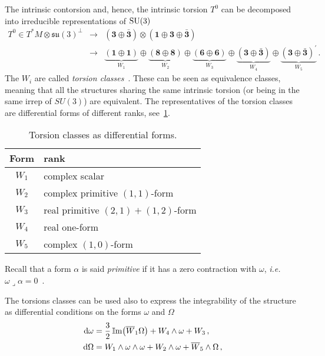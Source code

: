 \documentclass[debug]{phd}
\begin{document}
				The intrinsic contorsion and, hence, the intrinsic torsion $T^0$ can be decomposed into irreducible representations of $\mathrm{SU}(3)$					%
						\begin{equation*}
							\begin{array}{rrl}
								T^0 \in T^*M \otimes \mathfrak{su}(3)^{\perp}	& \rightarrow &	\left(\mathbf{3} \oplus \mathbf{\bar{3}}\right) \otimes \left(\mathbf{1} \oplus \mathbf{3} \oplus \mathbf{\bar{3}}\right)	\\[1.5mm]
																	& \rightarrow &	\underbrace{\left(\mathbf{1} \oplus \mathbf{1} \right)}_{W_1} \oplus \underbrace{\left(\mathbf{8} \oplus \mathbf{8} \right)}_{W_2} \oplus \underbrace{\left(\mathbf{6} \oplus \mathbf{6} \right)}_{W_3} \oplus \underbrace{\left(\mathbf{3} \oplus \mathbf{\bar{3}} \right)}_{W_4} \oplus \underbrace{\left(\mathbf{3} \oplus \mathbf{\bar{3}} \right)^\prime}_{W_5} \, .
							\end{array}
						\end{equation*}
				The $W_i$ are called \emph{torsion classes}~\cite{TorsClass1, TorsClass2}. These can be seen as equivalence classes, meaning that all the structures sharing the same intrinsic torsion (or being in the same irrep of $SU(3)$) are equivalent. The representatives of the torsion classes are differential forms of different ranks, see~\cref{tabW}.
						\begin{table}[h!]
						\centering
							\begin{tabular}{| c | l |}
								\toprule
								Form						&			rank								\\
								\hline
								$W_1$					& 			complex scalar						\\	
								$W_2 $	 				&			complex primitive $(1,1)$-form			\\	
								$W_3$		 			&			real primitive $(2,1) + (1,2)$-form		\\	
								$W_4$		 			&			real one-form						\\	
								$W_5$					&			complex $(1,0)$-form				\\
								\bottomrule
							\end{tabular}
							\caption{Torsion classes as differential forms.}
							\label{tabW}
						\end{table}
				
				Recall that a form $\alpha$ is said \emph{primitive} if it has a zero contraction with $\omega$, \emph{i.e.} $\omega\lrcorner \alpha = 0$~\cite{joyce}.
				
				The torsions classes can be used also to express the integrability of the structure as differential conditions on the forms $\omega$ and $\Omega$				%
						\begin{subequations}
						\label{diffstruct}
							\begin{align}
								\dd \omega 	&= \frac{3}{2} \IIm \left( \overline{W}_1 \Omega \right) + W_4 \wedge \omega + W_3 \, , \\
								\dd \Omega	&= W_1 \wedge \omega \wedge \omega + W_2 \wedge \omega + \overline{W}_5 \wedge \Omega \, ,
							\end{align}
						\end{subequations}
				
\end{document}

